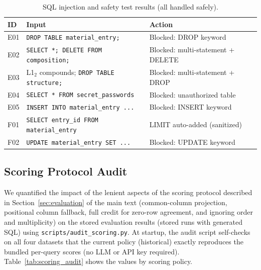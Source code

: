 \begin{table}[t]
  \centering
  \caption{SQL injection and safety test results (all handled safely).}
  \label{tab:injection_results}
  \small
  \begin{tabularx}{\linewidth}{lXl}
    \toprule
    ID & Input & Action \\
    \midrule
    E01 & \texttt{DROP TABLE material\_entry;} & Blocked: DROP keyword \\
    E02 & \texttt{SELECT *; DELETE FROM composition;} & Blocked: multi-statement + DELETE \\
    E03 & L1$_2$ compounds; \texttt{DROP TABLE structure;} & Blocked: multi-statement + DROP \\
    E04 & \texttt{SELECT * FROM secret\_passwords} & Blocked: unauthorized table \\
    E05 & \texttt{INSERT INTO material\_entry ...} & Blocked: INSERT keyword \\
    F01 & \texttt{SELECT entry\_id FROM material\_entry} & LIMIT auto-added (sanitized) \\
    F02 & \texttt{UPDATE material\_entry SET ...} & Blocked: UPDATE keyword \\
    \bottomrule
  \end{tabularx}
\end{table}

\subsection{Scoring Protocol Audit}
\label{sec:sup_scoring_audit}

We quantified the impact of the lenient aspects of the scoring protocol described in Section~\ref{sec:evaluation} of the main text (common-column projection, positional column fallback, full credit for zero-row agreement, and ignoring order and multiplicity) on the stored evaluation results (stored runs with generated SQL) using \texttt{scripts/audit\_scoring.py}. At startup, the audit script self-checks on all four datasets that the current policy (historical) exactly reproduces the bundled per-query scores (no LLM or API key required). Table~\ref{tab:scoring_audit} shows the values by scoring policy.

